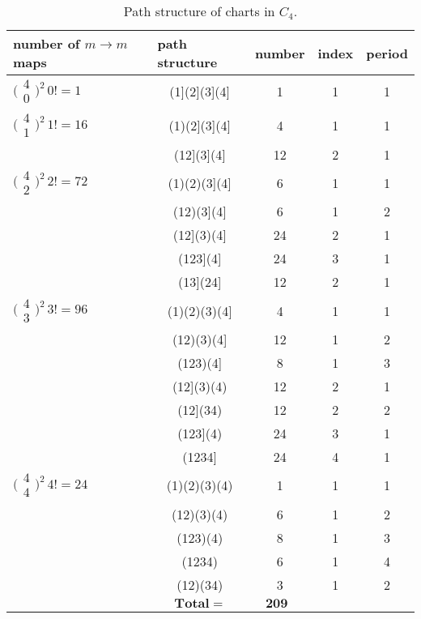 \documentclass{surv-l}
\numberwithin{equation}{section}
\numberwithin{table}{section}
\numberwithin{figure}{section}
\theoremstyle{plain}
\theoremstyle{definition}
\begin{document}
\begin{table}[!h]
\caption{Path structure of charts in $C_{4}$.}\label{tab2.7.1}
{\begin{tabular}{@{}|l|c|c|c|c|@{}} \hline
\multicolumn{1}{|l|}{\textbf{number of} $m\rightarrow m$ \textbf{maps}}&  \multicolumn{1}{|l|}{\textbf{path structure}}&   \multicolumn{1}{|l|}{\textbf{number}}& \multicolumn{1}{|l|}{\textbf{index}}& \multicolumn{1}{|l|}{\textbf{period}} \\
\hline
\multicolumn{1}{|l|}{$\big(\!\begin{smallmatrix}4 \\ 0\end{smallmatrix}\!\big)^{2}\,0!=1$} &(1](2](3](4] &1 &1 &1 \\
\hline
\multicolumn{1}{|l|}{$\big(\!\begin{smallmatrix} 4\\ 1\end{smallmatrix}\!\big)^{2}\,1!=16$} &(1)(2](3](4] &4 &1 &1 \\
&(12](3](4] &12 &2 &1 \\
\hline
\multicolumn{1}{|l|}{$\big(\!\begin{smallmatrix}4\\ 2\end{smallmatrix}\!\big)^{2}\,2!=72$}&(1)(2)(3](4]& 6&1&1 \\
&(12)(3](4]&6&1&2 \\
&(12](3)(4]& 24&2&1 \\
& (123](4] &24&3&1 \\
& (13](24]&12&2&1 \\
\hline
\multicolumn{1}{|l|}{$\big(\!\begin{smallmatrix}4\\ 3\end{smallmatrix}\!\big)^{2}\,3!=96$}& (1)(2)(3)(4]&4&1&1 \\
&(12)(3)(4]&12&1&2 \\
& (123)(4] &8&1&3 \\
&(12](3)(4)&12 &2&1 \\
& (12](34)&12 &2&2 \\
& (123](4) &24 &3&1 \\
&(1234]&24&4&1  \\
\hline
\multicolumn{1}{|l|}{$\big(\!\begin{smallmatrix}4\\ 4\end{smallmatrix}\!\big)^{2}\,4!=24$}&(1)(2)(3)(4)&1&1&1 \\
&(12)(3)(4)&6&1&2 \\
&(123)(4)&8&1&3 \\
&(1234)&6&1&4 \\
& (12)(34)&3&1&2 \\
\hline
&\multicolumn{2}{|c|}{$\mathbf{Total} = \qquad\quad \mathbf{209}$} & & \\
 \hline
\end{tabular}}{}
\end{table}
\end{document}
